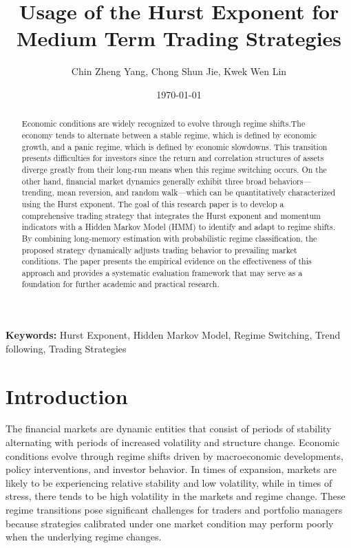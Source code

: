 \documentclass[12pt]{article}
\date{\today}
\title{Usage of the Hurst Exponent for Medium Term Trading Strategies }
\author{Chin Zheng Yang, Chong Shun Jie, Kwek Wen Lin}
\begin{document}
\maketitle

\begin{abstract}

Economic conditions are widely recognized to evolve through regime shifts.The economy tends to alternate between a stable regime, which is defined by economic growth, and a panic regime, which is defined by economic slowdowns. This transition presents difficulties for investors since the return and correlation structures of assets diverge greatly from their long-run means when this regime switching occurs. On the other hand, financial market dynamics generally exhibit three broad behaviors—trending, mean reversion, and random walk—which can be quantitatively characterized using the Hurst exponent. The goal of this research paper is to develop a comprehensive trading strategy that integrates the Hurst exponent and momentum indicators with a Hidden Markov Model (HMM) to identify and adapt to regime shifts. By combining long-memory estimation with probabilistic regime classification, the proposed strategy dynamically adjusts trading behavior to prevailing market conditions. The paper presents the empirical evidence on the effectiveness of this approach and provides a systematic evaluation framework that may serve as a foundation for further academic and practical research.

\end{abstract}

\noindent\textbf{Keywords:} Hurst Exponent, Hidden Markov Model, Regime Switching, Trend following, Trading Strategies

\section{Introduction}
The financial markets are dynamic entities that consist of periods of stability alternating with periods of increased volatility and structure change. Economic conditions evolve through regime shifts driven by macroeconomic developments, policy interventions, and investor behavior. In times of expansion, markets are likely to be experiencing relative stability and low volatility, while in times of stress, there tends to be high volatility in the markets and regime change. These regime transitions pose significant challenges for traders and portfolio managers because strategies calibrated under one market condition may perform poorly when the underlying regime changes.
\end{document}
